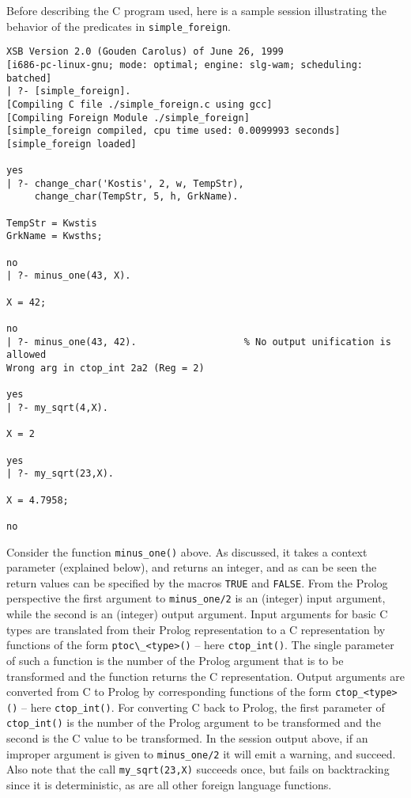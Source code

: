 Before describing the C program used, here is a sample session
illustrating the behavior of the predicates in {\tt simple\_foreign}.

\begin{small}
\begin{verbatim}
XSB Version 2.0 (Gouden Carolus) of June 26, 1999
[i686-pc-linux-gnu; mode: optimal; engine: slg-wam; scheduling: batched]
| ?- [simple_foreign].
[Compiling C file ./simple_foreign.c using gcc]
[Compiling Foreign Module ./simple_foreign]
[simple_foreign compiled, cpu time used: 0.0099993 seconds]
[simple_foreign loaded]

yes
| ?- change_char('Kostis', 2, w, TempStr), 
     change_char(TempStr, 5, h, GrkName).  

TempStr = Kwstis
GrkName = Kwsths;

no
| ?- minus_one(43, X).

X = 42;

no
| ?- minus_one(43, 42).                   % No output unification is allowed
Wrong arg in ctop_int 2a2 (Reg = 2)

yes
| ?- my_sqrt(4,X). 

X = 2

yes
| ?- my_sqrt(23,X).

X = 4.7958;

no
\end{verbatim}
\end{small}

Consider the function {\tt minus\_one()} above.  As discussed, it
takes a context parameter (explained below), and returns an integer,
and as can be seen the return values can be specified by the macros
{\tt TRUE} and {\tt FALSE}.  From the Prolog perspective the first
argument to {\tt minus\_one/2} is an (integer) input argument, while
the second is an (integer) output argument.  Input arguments for basic
C types are translated from their Prolog representation to a C
representation by functions of the form \verb|ptoc\_<type>()| -- here
{\tt ctop\_int()}.  The single parameter of such a function is the
number of the Prolog argument that is to be transformed and the
function returns the C representation.  Output arguments are converted
from C to Prolog by corresponding functions of the form
\verb|ctop_<type>()| -- here {\tt ctop\_int()}.  For converting C back
to Prolog, the first parameter of {\tt ctop\_int()} is the number of
the Prolog argument to be transformed and the second is the C value to
be transformed.  In the session output above, if an improper argument
is given to {\tt minus\_one/2} it will emit a warning, and succeed.
Also note that the call {\tt my\_sqrt(23,X)} succeeds once, but fails
on backtracking since it is deterministic, as are all other foreign
language functions.

